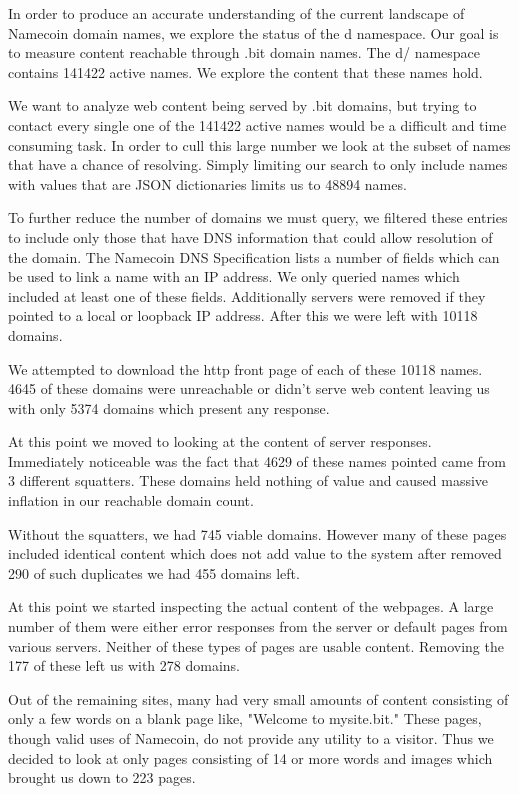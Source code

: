 In order to produce an accurate understanding of the current landscape of Namecoin domain names, we explore the status of the d namespace. Our goal is to measure content reachable through .bit domain names. The d/ namespace contains 141422 active names. We explore the content that these names hold.

We want to analyze web content being served by .bit domains, but trying to contact every single one of the 141422 active names would be a difficult and time consuming task. In order to cull this large number we look at the subset of names that have a chance of resolving. Simply limiting our search to only include names with values that are JSON dictionaries limits us to 48894 names.

To further reduce the number of domains we must query, we filtered these entries to include only those that have DNS information that could allow resolution of the domain. The Namecoin DNS Specification lists a number of fields which can be used to link a name with an IP address. We only queried names which included at least one of these fields. Additionally servers were removed if they pointed to a local or loopback IP address. After this we were left with 10118 domains.

We attempted to download the http front page of each of these 10118 names. 4645 of these domains were unreachable or didn't serve web content leaving us with only 5374 domains which present any response.

At this point we moved to looking at the content of server responses. Immediately noticeable was the fact that 4629 of these names pointed came from 3 different squatters. These domains held nothing of value and caused massive inflation in our reachable domain count.

Without the squatters, we had 745 viable domains. However many of these pages included identical content which does not add value to the system after removed 290 of such duplicates we had 455 domains left.

At this point we started inspecting the actual content of the webpages. A large number of them were either error responses from the server or default pages from various servers. Neither of these types of pages are usable content. Removing the 177 of these left us with 278 domains.

Out of the remaining sites, many had very small amounts of content consisting of only a few words on a blank page like, "Welcome to mysite.bit." These pages, though valid uses of Namecoin, do not provide any utility to a visitor. Thus we decided to look at only pages consisting of 14 or more words and images which brought us down to 223 pages.


